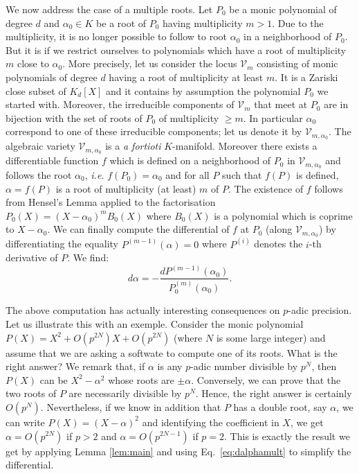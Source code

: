 \documentclass{lms}
\begin{document}
We now address the case of a multiple roots. Let $P_0$ be a monic 
polynomial of degree $d$ and $\alpha_0 \in K$ be a root of $P_0$ having 
multiplicity $m > 1$. Due to the multiplicity, it is no longer possible 
to follow to root $\alpha_0$ in a neighborhood of $P_0$. But it is if we 
restrict ourselves to polynomials which have a root of multiplicity $m$ 
close to $\alpha_0$. More precisely, let us consider the locus $\mathcal 
V_m$ consisting of monic polynomials of degree $d$ having a root of 
multiplicity at least $m$. It is a Zariski close subset of $K_d[X]$ and 
it contains by assumption the polynomial $P_0$ we started with. 
Moreover, the irreducible components of $\mathcal V_m$ that meet at 
$P_0$ are in bijection with the set of roots of $P_0$ of multiplicity 
$\geq m$. In particular $\alpha_0$ correspond to one of these 
irreducible components; let us denote it by $\mathcal V_{m,\alpha_0}$. 
The algebraic variety $\mathcal V_{m,\alpha_0}$ is a \emph{a fortioti} 
$K$-manifold. Moreover there exists a differentiable function $f$ which 
is defined on a neighborhood of $P_0$ in $\mathcal V_{m,\alpha_0}$ and 
follows the root $\alpha_0$, \emph{i.e.} $f(P_0) = \alpha_0$ and for all 
$P$ such that $f(P)$ is defined, $\alpha = f(P)$ is a root of 
multiplicity (at least) $m$ of $P$. The existence of $f$ follows from 
Hensel's Lemma applied to the factorisation $P_0(X) = (X-\alpha_0)^m 
B_0(X)$ where $B_0(X)$ is a polynomial which is coprime to $X - 
\alpha_0$. We can finally compute the differential of $f$ at $P_0$ 
(along $\mathcal V_{m,\alpha_0}$) by differentiating the equality
$P^{(m-1)}(\alpha) = 0$ where $P^{(i)}$ denotes the $i$-th derivative
of $P$. We find:
\begin{equation}
\label{eq:dalphamult}
d \alpha = - \frac{dP^{(m-1)}(\alpha_0)}{P_0^{(m)}(\alpha_0)}.
\end{equation}

The above computation has actually interesting consequences on $p$-adic 
precision. Let us illustrate this with an exemple. Consider the monic 
polynomial $P(X) = X^2 + O(p^{2N}) X + O(p^{2N})$ (where $N$ is some 
large integer) and assume that we are asking a softwate to compute one 
of its roots. What is the right answer? We remark that, if $\alpha$ is 
any $p$-adic number divisible by $p^N$, then $P(X)$ can be $X^2 - 
\alpha^2$ whose roots are $\pm \alpha$. Conversely, we can prove that 
the two roots of $P$ are necessarily divisible by $p^N$. Hence, the
right answer is certainly $O(p^N)$. Nevertheless, if we know in addition 
that $P$ has a double root, say $\alpha$, we can write $P(X) = (X - 
\alpha)^2$ and identifying the coefficient in $X$, we get $\alpha =
O(p^{2N})$ if $p > 2$ and $\alpha = O(p^{2N-1})$ if $p=2$.
This is exactly the result we get by applying Lemma \ref{lem:main} and
using Eq.~\eqref{eq:dalphamult} to simplify the differential.
\end{document}
